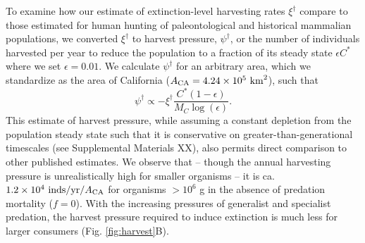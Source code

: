 \documentclass[11pt]{article}
\begin{document}
To examine how our estimate of extinction-level harvesting rates $\xi^\dagger$ compare to those estimated for human hunting of paleontological and historical mammalian populations, we converted $\xi^\dagger$ to harvest pressure, $\psi^\dagger$, or the number of individuals harvested per year to reduce the population to a fraction of its steady state $\epsilon C^*$ where we set $\epsilon = 0.01$.
We calculate $\psi^\dagger$ for an arbitrary area, which we standardize as the area of California ($A_{\rm CA} = 4.24\times10^5~{\rm km}^2$), such that
\begin{equation}
    \psi^\dagger \propto -\xi^\dagger\frac{C^*(1-\epsilon)}{M_C \log(\epsilon)}.
\end{equation}
This estimate of harvest pressure, while assuming a constant depletion from the population steady state such that it is conservative on greater-than-generational timescales (see Supplemental Materials XX), also permits direct comparison to other published estimates.
We observe that -- though the annual harvesting pressure is unrealistically high for smaller organisms -- it is ca. $1.2\times10^4~{\rm inds/yr/}A_{\rm CA}$ for organisms $>10^6$ g in the absence of predation mortality ($f=0$).
With the increasing pressures of generalist and specialist predation, the harvest pressure required to induce extinction is much less for larger consumers (Fig. \ref{fig:harvest}B).
\end{document}
